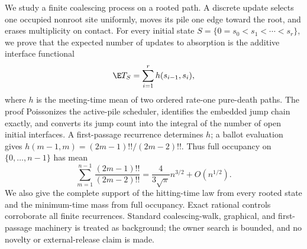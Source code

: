 We study a finite coalescing process on a rooted path.  A discrete update
selects one occupied nonroot site uniformly, moves its pile one edge toward
the root, and erases multiplicity on contact.  For every initial state
$S=\{0=s_0<s_1<\cdots<s_r\}$, we prove that the expected number of updates
to absorption is the additive interface functional
\[
 \E T_S=\sum_{i=1}^{r}h(s_{i-1},s_i),
\]
where $h$ is the meeting-time mean of two ordered rate-one pure-death paths.
The proof Poissonizes the active-pile scheduler, identifies the embedded
jump chain exactly, and converts its jump count into the integral of the
number of open initial interfaces.  A first-passage recurrence determines
$h$; a ballot evaluation gives
$h(m-1,m)=(2m-1)!!/(2m-2)!!$.  Thus full occupancy on
$\{0,\ldots,n-1\}$ has mean
\[
 \sum_{m=1}^{n-1}\frac{(2m-1)!!}{(2m-2)!!}
 =\frac{4}{3\sqrt\pi}n^{3/2}+O(n^{1/2}).
\]
We also give the complete support of the hitting-time law from every rooted
state and the minimum-time mass from full occupancy.  Exact rational controls
corroborate all finite recurrences.  Standard coalescing-walk, graphical,
and first-passage machinery is treated as background; the owner search is
bounded, and no novelty or external-release claim is made.

